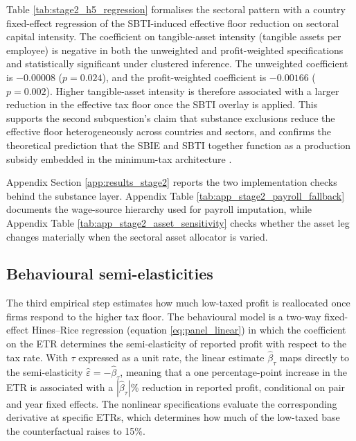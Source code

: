 \documentclass[11pt,a4paper]{article}
\begin{document}


Table \ref{tab:stage2_h5_regression} formalises the sectoral pattern with a country fixed-effect regression of the SBTI-induced effective floor reduction on sectoral capital intensity. The coefficient on tangible-asset intensity (tangible assets per employee) is negative in both the unweighted and profit-weighted specifications and statistically significant under clustered inference. The unweighted coefficient is $-0.00008$ ($p=0.024$), and the profit-weighted coefficient is $-0.00166$ ($p=0.002$). Higher tangible-asset intensity is therefore associated with a larger reduction in the effective tax floor once the SBTI overlay is applied. This supports the second subquestion's claim that substance exclusions reduce the effective floor heterogeneously across countries and sectors, and confirms the theoretical prediction that the SBIE and SBTI together function as a production subsidy embedded in the minimum-tax architecture \citep{schjelderup2024}. 

Appendix Section \ref{app:results_stage2} reports the two implementation checks behind the substance layer. Appendix Table \ref{tab:app_stage2_payroll_fallback} documents the wage-source hierarchy used for payroll imputation, while Appendix Table \ref{tab:app_stage2_asset_sensitivity} checks whether the asset leg changes materially when the sectoral asset allocator is varied.


\subsection{Behavioural semi-elasticities}\label{sec:results_stage3}

The third empirical step estimates how much low-taxed profit is reallocated once firms respond to the higher tax floor. The behavioural model is a two-way fixed-effect Hines--Rice regression (equation \ref{eq:panel_linear}) in which the coefficient on the ETR determines the semi-elasticity of reported profit with respect to the tax rate. With $\tau$ expressed as a unit rate, the linear estimate $\hat{\beta}_{\tau}$ maps directly to the semi-elasticity $\hat{\varepsilon}=-\hat{\beta}_{\tau}$, meaning that a one percentage-point increase in the ETR is associated with a $|\hat{\beta}_{\tau}|$\% reduction in reported profit, conditional on pair and year fixed effects. The nonlinear specifications evaluate the corresponding derivative at specific ETRs, which determines how much of the low-taxed base the counterfactual raises to 15\%.
\end{document}
